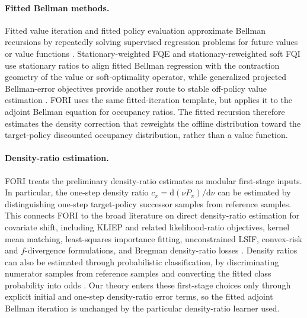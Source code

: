 \documentclass{article}
\newcommand{\1}{\mathbf{1}}
\newcommand{\dd}{\mathrm{d}}
\newcommand{\cpi}{c_\pi}
\newcommand{\Ppi}{P_\pi}
\theoremstyle{plain}
\theoremstyle{definition}
\theoremstyle{remark}
\begin{document}
\paragraph{Fitted Bellman methods.}
Fitted value iteration and fitted policy evaluation approximate Bellman
recursions by repeatedly solving supervised regression problems for future values
or value functions
\citep{lagoudakisParr2003LSPI,ernstEtAl2005TreeBatchRL,antosEtAl2007FQI,
munosSzepesvari2008FVI,leEtAl2019BatchPolicyConstraints}.
Stationary-weighted FQE and stationary-reweighted soft FQI use stationary ratios
to align fitted Bellman regression with the contraction geometry of the value or
soft-optimality operator, while generalized projected Bellman-error objectives
provide another route to stable off-policy value estimation
\citep{vanDerLaanKallus2025StationaryWeightedFQE,
vanDerLaanKallus2025SoftFQI,pattersonEtAl2022GeneralizedPBE}.
\textsc{FORI} uses the same fitted-iteration template, but applies it to the
adjoint Bellman equation for occupancy ratios. The fitted recursion therefore
estimates the density correction that reweights the offline distribution toward
the target-policy discounted occupancy distribution, rather than a value
function.

\paragraph{Density-ratio estimation.}
\textsc{FORI} treats the preliminary density-ratio estimates as modular
first-stage inputs. In particular, the one-step density ratio
\(\cpi=\dd(\nu\Ppi)/\dd\nu\) can be estimated by distinguishing one-step
target-policy successor samples from reference samples. This connects
\textsc{FORI} to the broad literature on direct density-ratio estimation for
covariate shift, including KLIEP and related likelihood-ratio objectives,
kernel mean matching, least-squares importance fitting, unconstrained LSIF,
convex-risk and \(f\)-divergence formulations, and Bregman density-ratio losses
\citep{huangEtAl2006KMM,tsuboiEtAl2008KLIEP,kanamoriEtAl2009LSIF,
nguyenEtAl2010ConvexRatio,gutmannHirayama2011Bregman,
sugiyamaEtAl2012BregmanDensityRatio,sugiyamaEtAl2012DensityRatioBook,
hines2025learning}. Density ratios can also be estimated through
probabilistic classification, by discriminating numerator samples from
reference samples and converting the fitted class probability into odds
\citep{qin1998Inferences,chengChu2004SemiparametricDensity,
bickelEtAl2008Multitask,menonOng2016DensityRatioClassification}.
Our theory enters these first-stage choices only through explicit initial and
one-step density-ratio error terms, so the fitted adjoint Bellman iteration is
unchanged by the particular density-ratio learner used.
\end{document}
